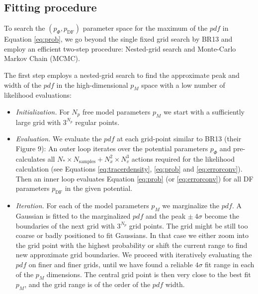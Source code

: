 \documentclass[iop,revtex4,numberedappendix,appendixfloats]{emulateapj}
\newcommand{\pdf}{\ensuremath{pdf}}
\newcommand{\pmodel}{\ensuremath{p_M}}
\begin{document}
\subsection{Fitting procedure} \label{sec:fitting}

To search the $(p_\Phi,p_\text{DF})$ parameter space for the maximum of the \pdf{} in Equation \eqref{eq:prob}, we go beyond the single fixed grid search by BR13 and employ an efficient two-step procedure: Nested-grid search and Monte-Carlo Markov Chain (MCMC).

The first step employs a nested-grid search to find the approximate peak and width of the \pdf{} in the high-dimensional \pmodel{} space with a low number of likelihood evaluations:

\begin{itemize}
\item \emph{Initialization.} For $N_p$ free model parameters \pmodel{} we start with a sufficiently large grid with $3^{N_p}$ regular points.

\item \emph{Evaluation.} We evaluate the \pdf{} at each grid-point similar to BR13 (their Figure 9): An outer loop iterates over the potential parameters $p_\Phi$ and pre-calculates all $N_* \times N_\text{samples} + N_x^2 \times N_v^3$ actions required for the likelihood calculation (see Equations \eqref{eq:tracerdensity}, \eqref{eq:prob} and \eqref{eq:errorconv}). Then an inner loop evaluates Equation \eqref{eq:prob} (or \eqref{eq:errorconv}) for all DF parameters $p_\text{DF}$ in the given potential.

\item \emph{Iteration.} For each of the model parameters \pmodel{} we marginalize the \pdf{}. A Gaussian is fitted to the marginalized \pdf{} and the peak $\pm ~ 4\sigma$ become the boundaries of the next grid with $3^{N_p}$ grid points. The grid might be still too coarse or badly positioned to fit Gaussians. In that case we either zoom into the grid point with the highest probability or shift the current range to find new approximate grid boundaries. We proceed with iteratively evaluating the \pdf{} on finer and finer grids, until we have found a reliable $4\sigma$ fit range in each of the \pmodel{} dimensions. The central grid point is then very close to the best fit \pmodel{}, and the grid range is of the order of the \pdf{} width.


\end{itemize}
\end{document}

